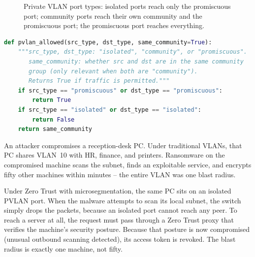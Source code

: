 \begin{figure}[h]
\centering
{}
\caption{Private VLAN port types: isolated ports reach only the promiscuous port; community ports
reach their own community and the promiscuous port; the promiscuous port reaches everything.}
\label{fig:3.3-pvlan}
\end{figure}

\begin{lstlisting}[language=Python, caption={Evaluating a PVLAN traffic request by port type}]
def pvlan_allowed(src_type, dst_type, same_community=True):
    """src_type, dst_type: "isolated", "community", or "promiscuous".
       same_community: whether src and dst are in the same community
       group (only relevant when both are "community").
       Returns True if traffic is permitted."""
    if src_type == "promiscuous" or dst_type == "promiscuous":
        return True
    if src_type == "isolated" or dst_type == "isolated":
        return False
    return same_community
\end{lstlisting}

\begin{example}
An attacker compromises a reception-desk PC. Under traditional VLANs, that PC shares VLAN~10 with
HR, finance, and printers. Ransomware on the compromised machine scans the subnet, finds an
exploitable service, and encrypts fifty other machines within minutes -- the entire VLAN was one
blast radius.

Under Zero Trust with microsegmentation, the same PC sits on an isolated PVLAN port. When the
malware attempts to scan its local subnet, the switch simply drops the packets, because an isolated
port cannot reach any peer. To reach a server at all, the request must pass through a Zero Trust
proxy that verifies the machine's security posture. Because that posture is now compromised
(unusual outbound scanning detected), its access token is revoked. The blast radius is exactly one
machine, not fifty.
\end{example}

